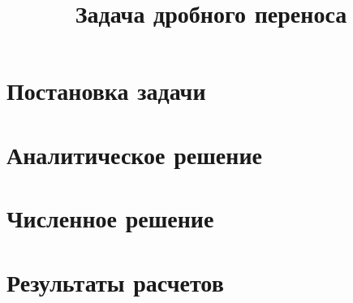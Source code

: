 \documentclass[12pt, russian, indentheadings]{report}
\begin{document}

\renewcommand{\labelitemi}{---}
\renewcommand{\labelitemii}{---}
\renewcommand{\labelitemiii}{---}
\renewcommand{\figurename}{Рисунок}
\renewcommand\thefigure{\Alph{part}.\arabic{chapter}.\arabic{figure}}
\renewcommand\thetable{\Alph{part}.\arabic{chapter}.\arabic{table}}
\frenchspacing

\title{Задача дробного переноса}


\chapter{Постановка задачи}


\chapter{Аналитическое решение}


\chapter{Численное решение}


\chapter{Результаты расчетов}


%	
\end{document}
